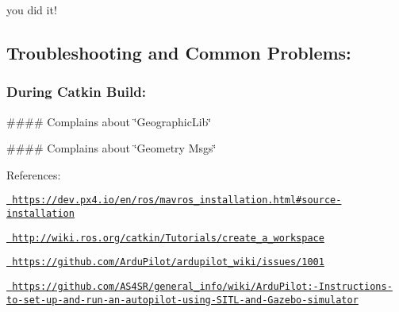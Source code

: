 you did it! 🎉

\DoxyHorRuler


\subsection*{Troubleshooting and Common Problems\+:}

\subsubsection*{During Catkin Build\+:}

\#\#\#\# Complains about \char`\"{}\+Geographic\+Lib\char`\"{} 
\begin{DoxyCode}{0}
\end{DoxyCode}


\#\#\#\# Complains about \char`\"{}\+Geometry Msgs\char`\"{} 
\begin{DoxyCode}{0}
\end{DoxyCode}


\DoxyHorRuler


References\+:
\begin{DoxyItemize}
\item \href{https://dev.px4.io/en/ros/mavros_installation.html\#source-installation}{\texttt{ https\+://dev.\+px4.\+io/en/ros/mavros\+\_\+installation.\+html\#source-\/installation}}
\item \href{http://wiki.ros.org/catkin/Tutorials/create_a_workspace}{\texttt{ http\+://wiki.\+ros.\+org/catkin/\+Tutorials/create\+\_\+a\+\_\+workspace}}
\item \href{https://github.com/ArduPilot/ardupilot_wiki/issues/1001}{\texttt{ https\+://github.\+com/\+Ardu\+Pilot/ardupilot\+\_\+wiki/issues/1001}}
\item \href{https://github.com/AS4SR/general_info/wiki/ArduPilot:-Instructions-to-set-up-and-run-an-autopilot-using-SITL-and-Gazebo-simulator}{\texttt{ https\+://github.\+com/\+A\+S4\+S\+R/general\+\_\+info/wiki/\+Ardu\+Pilot\+:-\/\+Instructions-\/to-\/set-\/up-\/and-\/run-\/an-\/autopilot-\/using-\/\+S\+I\+T\+L-\/and-\/\+Gazebo-\/simulator}} 
\end{DoxyItemize}